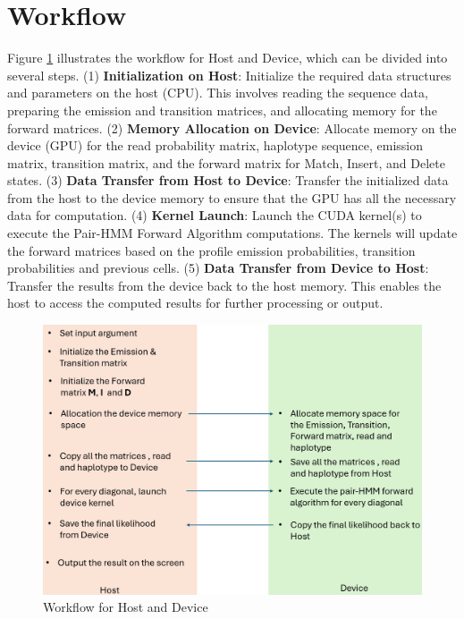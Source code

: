 \documentclass[PhD]{PHlab-thesis}
\begin{document}
\section{Workflow}
Figure \ref{fig:workflow} illustrates the workflow for Host and Device, which can be divided into several steps.
(1) \textbf{Initialization on Host}: Initialize the required data structures and parameters on the host (CPU). This involves reading the sequence data, preparing the emission and transition matrices, and allocating memory for the forward matrices. (2) \textbf{Memory Allocation on Device}: Allocate memory on the device (GPU) for the read probability matrix, haplotype sequence, emission matrix, transition matrix, and the forward matrix for Match, Insert, and Delete states. (3) \textbf{Data Transfer from Host to Device}: Transfer the initialized data from the host to the device memory to ensure that the GPU has all the necessary data for computation. (4) \textbf{Kernel Launch}: Launch the CUDA kernel(s) to execute the Pair-HMM Forward Algorithm computations. The kernels will update the forward matrices based on the profile emission probabilities, transition probabilities and previous cells. (5) \textbf{Data Transfer from Device to Host}: Transfer the results from the device back to the host memory. This enables the host to access the computed results for further processing or output.
\begin{figure}
    \centering
    \includegraphics[width=1.1\linewidth]{figure/Host-Device.png}
    \caption{Workflow for Host and Device}
    \label{fig:workflow}
\end{figure}
\end{document}

